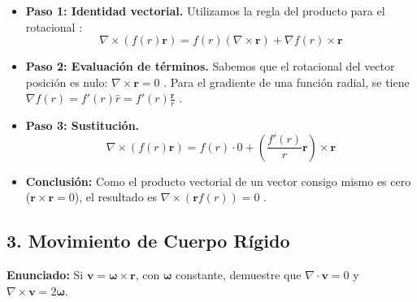 \documentclass[a4paper]{article}
\begin{document}
\begin{itemize}
    \item \textbf{Paso 1: Identidad vectorial.} Utilizamos la regla del producto para el rotacional \cite{98, 109}:
    \begin{equation}
        \nabla \times (f(r) \mathbf{r}) = f(r) (\nabla \times \mathbf{r}) + \nabla f(r) \times \mathbf{r}
    \end{equation}
    \item \textbf{Paso 2: Evaluación de términos.} Sabemos que el rotacional del vector posición es nulo: $\nabla \times \mathbf{r} = 0$ \cite{109}. Para el gradiente de una función radial, se tiene $\nabla f(r) = f'(r) \hat{r} = f'(r) \frac{\mathbf{r}}{r}$ \cite{82}.
    \item \textbf{Paso 3: Sustitución.}
    \begin{equation}
        \nabla \times (f(r) \mathbf{r}) = f(r) \cdot 0 + \left( \frac{f'(r)}{r} \mathbf{r} \right) \times \mathbf{r}
    \end{equation}
    \item \textbf{Conclusión:} Como el producto vectorial de un vector consigo mismo es cero ($\mathbf{r} \times \mathbf{r} = 0$), el resultado es $\nabla \times (\mathbf{r} f(r)) = 0$ \cite{97}.
\end{itemize}

\subsection*{3. Movimiento de Cuerpo Rígido}
\textbf{Enunciado:} Si $\mathbf{v} = \mathbf{\omega} \times \mathbf{r}$, con $\mathbf{\omega}$ constante, demuestre que $\nabla \cdot \mathbf{v} = 0$ y $\nabla \times \mathbf{v} = 2\mathbf{\omega}$.
\end{document}
